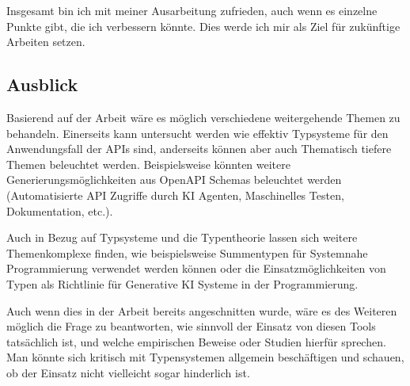 Insgesamt bin ich mit meiner Ausarbeitung zufrieden, auch wenn es einzelne Punkte gibt, die ich verbessern könnte.
Dies werde ich mir als Ziel für zukünftige Arbeiten setzen.

\subsection{Ausblick}

Basierend auf der Arbeit wäre es möglich verschiedene weitergehende Themen zu behandeln. 
Einerseits kann untersucht werden wie effektiv Typsysteme für den Anwendungsfall der APIs sind, 
anderseits können aber auch Thematisch tiefere Themen beleuchtet werden. 
Beispielsweise könnten weitere Generierungsmöglichkeiten aus OpenAPI Schemas beleuchtet werden 
(Automatisierte API Zugriffe durch KI Agenten, Maschinelles Testen, Dokumentation, etc.).

Auch in Bezug auf Typsysteme und die Typentheorie lassen sich weitere Themenkomplexe finden, wie
beispielsweise Summentypen für Systemnahe Programmierung verwendet werden können oder die Einsatzmöglichkeiten
von Typen als Richtlinie für Generative KI Systeme in der Programmierung.

Auch wenn dies in der Arbeit bereits angeschnitten wurde, wäre es des Weiteren möglich die Frage zu beantworten,
wie sinnvoll der Einsatz von diesen Tools tatsächlich ist, und welche empirischen Beweise oder Studien hierfür sprechen.
Man könnte sich kritisch mit Typensystemen allgemein beschäftigen und schauen, ob der Einsatz nicht vielleicht
sogar hinderlich ist.
